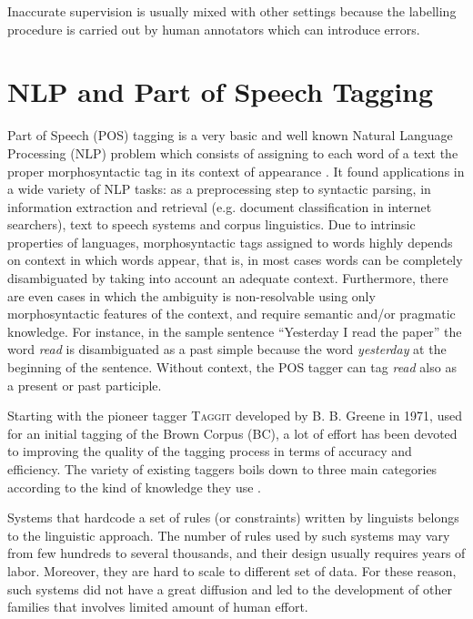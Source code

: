 Inaccurate supervision is usually mixed with other settings because
the labelling procedure is carried out by human annotators which can
introduce errors.

\section{NLP and Part of Speech Tagging}
\label{sec:nlp-pos}

Part of Speech (POS) tagging is a very basic and well known Natural
Language Processing (NLP) problem which consists of assigning to each
word of a text the proper morphosyntactic tag in its context of
appearance \cite{marquez2000machine}. It found applications in a wide
variety of NLP tasks: as a preprocessing step to syntactic parsing, in
information extraction and retrieval (e.g. document classification in
internet searchers), text to speech systems and corpus linguistics.
Due to intrinsic properties of languages, morphosyntactic tags
assigned to words highly depends on context in which words appear,
that is, in most cases words can be completely disambiguated  
by taking into account an adequate context. Furthermore, there are
even cases in which the ambiguity is non-resolvable using only
morphosyntactic features of the context, and require semantic and/or
pragmatic knowledge. For instance, in the sample sentence ``Yesterday
I read the paper'' the word \textit{read} is disambiguated as a past
simple because the word \textit{yesterday} at the beginning of the
sentence. Without context, the POS tagger can tag \textit{read} also
as a present or past participle.

Starting with the pioneer tagger \textsc{Taggit} developed by B. B.
Greene \etal{} in 1971, used for an initial tagging of the Brown
Corpus (BC), a lot of effort has been devoted to improving the quality
of the tagging process in terms of accuracy and efficiency. The
variety of existing taggers boils down to three main categories
according to the kind of knowledge they use \cite{marquez2000machine}. 

Systems that hardcode a set of rules (or constraints) written by
linguists belongs to the linguistic approach. The number of rules used
by such systems may vary from few hundreds to several thousands, and
their design usually requires years of labor. Moreover, they are hard
to scale to different set of data. For these reason, such systems did
not have a great diffusion and led to the development of other
families that involves limited amount of human effort.

